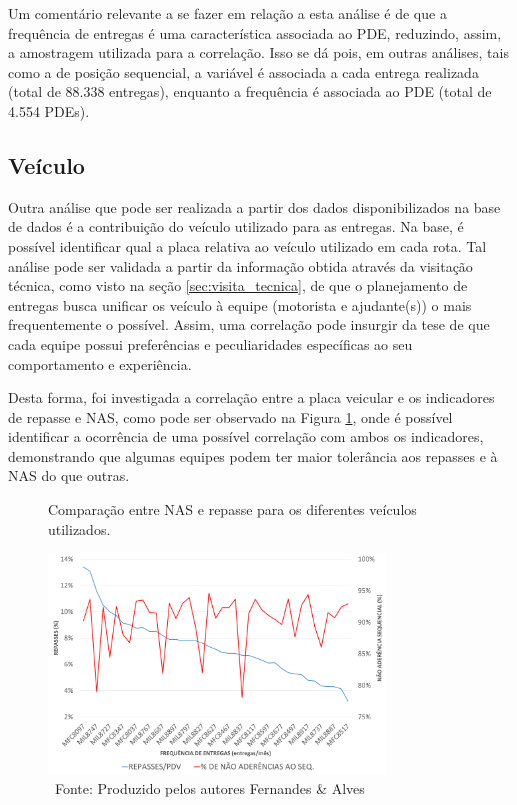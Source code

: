 Um comentário relevante a se fazer em relação a esta análise é de que a frequência de entregas é uma característica associada ao PDE, reduzindo, assim, a amostragem utilizada para a correlação.
Isso se dá pois, em outras análises, tais como a de posição sequencial, a variável é associada a cada entrega realizada (total de 88.338 entregas), enquanto a frequência é associada ao PDE (total de 4.554 PDEs).

\subsection{Veículo}

Outra análise que pode ser realizada a partir dos dados disponibilizados na base de dados é a contribuição do veículo utilizado para as entregas. 
Na base, é possível identificar qual a placa relativa ao veículo utilizado em cada rota. 
Tal análise pode ser validada a partir da informação obtida através da visitação técnica, como visto na seção \ref{sec:visita_tecnica}, de que o planejamento de entregas busca unificar os veículo à equipe (motorista e ajudante(s)) o mais frequentemente o possível. 
Assim, uma correlação pode insurgir da tese de que cada equipe possui preferências e peculiaridades específicas ao seu comportamento e experiência.

Desta forma, foi investigada a correlação entre a placa veicular e os indicadores de repasse e NAS, como pode ser observado na Figura \ref{fig:Veiculo}, onde é possível identificar a ocorrência de uma possível correlação com ambos os indicadores, demonstrando que algumas equipes podem ter maior tolerância aos repasses e à NAS do que outras.

\begin{figure}[H]
    \centering
    \caption{Comparação entre NAS e repasse para os diferentes veículos utilizados.}
    \includegraphics[width=0.8\textwidth]{images/5_emp_bebidas/excel_based/Veiculo.png}
    \caption*{\ Fonte: Produzido pelos autores Fernandes \& Alves}
    \label{fig:Veiculo}
\end{figure} %

